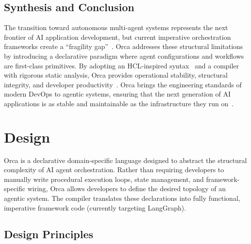 \documentclass[sigconf,nonacm]{acmart}
\begin{document}
\subsection{Synthesis and Conclusion}
\label{sec:litreview:synthesis}

The transition toward autonomous multi-agent systems represents the next
frontier of AI application development, but current imperative orchestration
frameworks create a ``fragility gap''~\cite{docker2025cagent,manias2024skills}.
Orca addresses these structural limitations by introducing a declarative
paradigm where agent configurations and workflows are first-class
primitives. By adopting an HCL-inspired syntax~\cite{terraform2024} and a
compiler with rigorous static analysis, Orca provides operational stability,
structural integrity, and developer productivity~\cite{terraform2024,docker2025cagent}.
Orca brings the engineering standards of modern DevOps to agentic systems,
ensuring that the next generation of AI applications is as stable and
maintainable as the infrastructure they run on~\cite{burns2016borg,terraform2024}.

\section{Design}
\label{sec:design}

Orca is a declarative domain-specific language designed to abstract the
structural complexity of AI agent orchestration. Rather than requiring
developers to manually write procedural execution loops, state management,
and framework-specific wiring, Orca allows developers to define the desired
topology of an agentic system. The compiler translates these declarations
into fully functional, imperative framework code (currently targeting
LangGraph).

\subsection{Design Principles}
\label{sec:design:principles}
\end{document}
